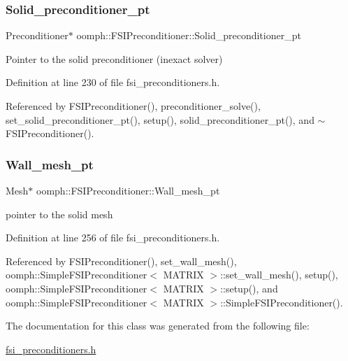 \subsubsection{\texorpdfstring{Solid\+\_\+preconditioner\+\_\+pt}{Solid\_preconditioner\_pt}}
{\footnotesize\ttfamily Preconditioner$\ast$ oomph\+::\+F\+S\+I\+Preconditioner\+::\+Solid\+\_\+preconditioner\+\_\+pt\hspace{0.3cm}{\ttfamily [private]}}



Pointer to the solid preconditioner (inexact solver) 



Definition at line 230 of file fsi\+\_\+preconditioners.\+h.



Referenced by F\+S\+I\+Preconditioner(), preconditioner\+\_\+solve(), set\+\_\+solid\+\_\+preconditioner\+\_\+pt(), setup(), solid\+\_\+preconditioner\+\_\+pt(), and $\sim$\+F\+S\+I\+Preconditioner().

\mbox{\label{classoomph_1_1FSIPreconditioner_ae86cf988796524f905c8d6edc942816a}} 
\subsubsection{\texorpdfstring{Wall\+\_\+mesh\+\_\+pt}{Wall\_mesh\_pt}}
{\footnotesize\ttfamily Mesh$\ast$ oomph\+::\+F\+S\+I\+Preconditioner\+::\+Wall\+\_\+mesh\+\_\+pt\hspace{0.3cm}{\ttfamily [private]}}



pointer to the solid mesh 



Definition at line 256 of file fsi\+\_\+preconditioners.\+h.



Referenced by F\+S\+I\+Preconditioner(), set\+\_\+wall\+\_\+mesh(), oomph\+::\+Simple\+F\+S\+I\+Preconditioner$<$ M\+A\+T\+R\+I\+X $>$\+::set\+\_\+wall\+\_\+mesh(), setup(), oomph\+::\+Simple\+F\+S\+I\+Preconditioner$<$ M\+A\+T\+R\+I\+X $>$\+::setup(), and oomph\+::\+Simple\+F\+S\+I\+Preconditioner$<$ M\+A\+T\+R\+I\+X $>$\+::\+Simple\+F\+S\+I\+Preconditioner().



The documentation for this class was generated from the following file\+:\begin{DoxyCompactItemize}
\item 
\hyperlink{fsi__preconditioners_8h}{fsi\+\_\+preconditioners.\+h}\end{DoxyCompactItemize}
